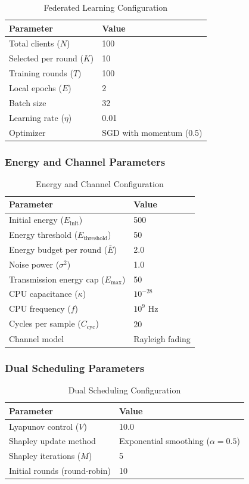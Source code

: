 \begin{table}[h]
\centering
\caption{Federated Learning Configuration}
\begin{tabular}{ll}
\hline
\textbf{Parameter} & \textbf{Value} \\
\hline
Total clients ($N$) & 100 \\
Selected per round ($K$) & 10 \\
Training rounds ($T$) & 100 \\
Local epochs ($E$) & 2 \\
Batch size & 32 \\
Learning rate ($\eta$) & 0.01 \\
Optimizer & SGD with momentum (0.5) \\
\hline
\end{tabular}
\end{table}

\subsubsection{Energy and Channel Parameters}

\begin{table}[h]
\centering
\caption{Energy and Channel Configuration}
\begin{tabular}{ll}
\hline
\textbf{Parameter} & \textbf{Value} \\
\hline
Initial energy ($E_{\text{init}}$) & 500 \\
Energy threshold ($E_{\text{threshold}}$) & 50 \\
Energy budget per round ($\bar{E}$) & 2.0 \\
Noise power ($\sigma^2$) & 1.0 \\
Transmission energy cap ($E_{\max}$) & 50 \\
CPU capacitance ($\kappa$) & $10^{-28}$ \\
CPU frequency ($f$) & $10^{9}$ Hz \\
Cycles per sample ($C_{\text{cyc}}$) & 20 \\
Channel model & Rayleigh fading \\
\hline
\end{tabular}
\end{table}

\subsubsection{Dual Scheduling Parameters}

\begin{table}[h]
\centering
\caption{Dual Scheduling Configuration}
\begin{tabular}{ll}
\hline
\textbf{Parameter} & \textbf{Value} \\
\hline
Lyapunov control ($V$) & 10.0 \\
Shapley update method & Exponential smoothing ($\alpha=0.5$) \\
Shapley iterations ($M$) & 5 \\
Initial rounds (round-robin) & 10 \\
\hline
\end{tabular}
\end{table}

